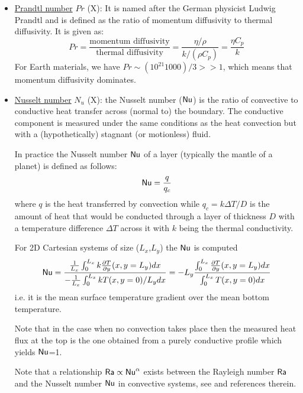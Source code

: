 \begin{itemize}
\item \underline{Prandtl number} $Pr$ (X):  
It is named after the German physicist 
Ludwig Prandtl and is defined as the ratio of momentum diffusivity to thermal diffusivity. 
It is given as: 
\[
Pr = \frac{\text{momentum diffusivity}}{\text{thermal diffusivity}} = \frac{\eta/\rho}{k/(\rho C_p)}= \frac{\eta C_p}{k}
\]
For Earth materials, we have $Pr \sim (10^{21} 1000)/3 >> 1$, 
which means that momentum diffusivity dominates.

\item \underline{Nusselt number} $N_u$ (X):   
the Nusselt number (${\mathsf{Nu}}$) 
is the ratio of convective to conductive heat transfer across (normal to) the boundary. 
The conductive component is measured under the same conditions as the heat convection 
but with a (hypothetically) stagnant (or motionless) fluid.

In practice the Nusselt number ${\mathsf{Nu}}$ of a layer (typically the mantle of a planet) is defined as follows:
\begin{equation}
{\mathsf{Nu}} = \frac{q}{q_c}
\end{equation} 
where $q$ is the heat transferred by convection while $q_c=k \Delta T /D$ 
is the amount of heat that would be conducted through a layer of
thickness $D$ with a temperature difference $\Delta T$ across it with 
$k$ being the thermal conductivity.

For 2D Cartesian systems of size ($L_x$,$L_y$) the ${\mathsf{Nu}}$ is computed \cite{blbc89}
\[
{\mathsf{Nu}} = 
\frac{\frac{1}{L_x}\int_{0}^{L_x} k \frac{\partial T}{\partial y}(x,y=L_y) dx }
{-\frac{1}{L_x}\int_0^{L_x} k T(x,y=0) /L_y dx}
=-L_y \frac{\int_{0}^{L_x} \frac{\partial T}{\partial y}(x,y=L_y) dx }{\int_0^{L_x} T(x,y=0) dx}
\]
i.e. it is the mean surface temperature gradient
over the mean bottom temperature.


Note that in the case when no convection takes place then the measured heat flux at the top is 
the one obtained from a purely conductive profile which yields ${\mathsf{Nu}}$=1.

Note that a relationship  ${\mathsf{Ra}} \propto {\mathsf{Nu}}^\alpha $ exists between the Rayleigh 
number ${\mathsf{Ra}}$ and the Nusselt number ${\mathsf{Nu}}$ in convective systems, see \cite{wodd09} and references therein. 


\end{itemize}
